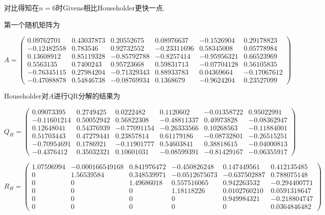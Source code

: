 \documentclass[UTF8]{ctexart}
\begin{document}
对比得知在$n=6$时Givens相比Householder更快一点.

第一个随机矩阵为

\begin{equation}\label{1-d-1}
    A=\left(
        \begin{array}{cccccc}
            0.09762701 & 0.43037873 & 0.20552675 & 0.08976637 & -0.1526904  & 0.29178823\\
            -0.12482558 &  0.783546  &  0.92732552 & -0.23311696 & 0.58345008 & 0.05778984\\
            0.13608912 & 0.85119328 & -0.85792788 & -0.8257414 & -0.95956321 & 0.66523969\\
            0.5563135 &  0.7400243 &  0.95723668 & 0.59831713 & -0.07704128 & 0.56105835\\
            -0.76345115 & 0.27984204 & -0.71329343 & 0.88933783 & 0.04369664 & -0.17067612\\
            -0.47088878 & 0.54846738 & -0.08769934 & 0.1368679 & -0.9624204 &  0.23527099
        \end{array}
    \right)
\end{equation}

Householder对$A$进行QR分解的结果为

\begin{equation}\label{1-d-2}
    Q_H=\left(
        \begin{array}{cccccc}
            0.09073395 & 0.2749425  & 0.0222482  & 0.1120602 & -0.01358722 & 0.95022991\\
            -0.11601214 & 0.50052942 & 0.56822308 & -0.48811337 & 0.40973828 & -0.08362947\\
             0.12648041 & 0.54376939 &-0.77091154 &-0.26333566 & 0.10268563 & -0.11884001\\
             0.51703443 & 0.47279441 & 0.23857814 & 0.61179186 &-0.08732801 & -0.26515251\\
            -0.70954691 & 0.1786921 & -0.11901777 & 0.54603841 & 0.38818615 &-0.04000813\\
            -0.4376412  & 0.35032321 & 0.10601031 &-0.08599391 &-0.81429167 &-0.06355917
        \end{array}
    \right)
\end{equation}

\begin{equation}\label{1-d-3}
    R_H=\left(
        \begin{array}{cccccc}
            1.07596994 & -0.000166549168 & 0.841976472 & -0.450826248 & 0.147449561 & 0.412135485\\
            0 & 1.56539584 & 0.348539971 & -0.0512675673 & -0.637502887 & 0.788075148\\
            0 & 0 & 1.49686018 & 0.557516065 & 0.942263532 & -0.294400771\\
            0 & 0 & 0 & 1.18118226 & 0.0102760210 & 0.0591318647\\
            0 & 0 & 0 & 0 & 0.949984321 & -0.218804747\\
            0 & 0 & 0 & 0 & 0 & 0.0364846482
        \end{array}
    \right)
\end{equation}
\end{document}
